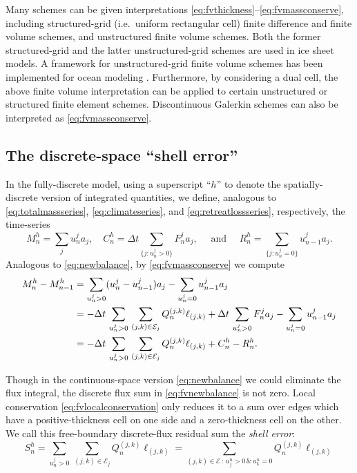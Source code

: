 \documentclass[final,leqno,onefignum,onetabnum]{siamltex1213bueler}
\begin{document}
Many schemes can be given interpretations \eqref{eq:fvthickness}--\eqref{eq:fvmassconserve}, including structured-grid (i.e.~uniform rectangular cell) finite difference \cite{MortonMayers2005} and finite volume \cite{LeVeque2002} schemes, and unstructured finite volume schemes.  Both the former structured-grid \cite{Winkelmannetal2011} and the latter unstructured-grid \cite{EgholmNielsen2010} schemes are used in ice sheet models.  A framework for unstructured-grid finite volume schemes has been implemented for ocean modeling \cite{Ringleretal2013}.  Furthermore, by considering a dual cell, the above finite volume interpretation can be applied to certain unstructured or structured finite element schemes.  Discontinuous Galerkin schemes can also be interpreted as \eqref{eq:fvmassconserve}.

\subsection{The discrete-space ``shell error''}  \label{subsec:shellerror}  In the fully-discrete model, using a superscript ``$h$'' to denote the spatially-discrete version of integrated quantities, we define, analogous to \eqref{eq:totalmassseries}, \eqref{eq:climateseries}, and \eqref{eq:retreatlossseries}, respectively, the time-series
\begin{equation}
  M_n^h = \sum_j u_n^j a_j, \quad C_n^h = \Delta t\!\!\sum_{\{j:u_n^j>0\}} F_n^j a_j, \quad \text{ and } \quad R_n^h = \sum_{\{j:u_n^j=0\}} u_{n-1}^j a_j.  \label{eq:fvtimeseriesdefn}
\end{equation}
Analogous to \eqref{eq:newbalance}, by \eqref{eq:fvmassconserve} we compute
\begin{align}
M_n^h - M_{n-1}^h &= \sum_{u_n^j>0} (u_n^j - u_{n-1}^j) a_j - \sum_{u_n^j=0} u_{n-1}^j a_j \notag \\
   &= - \Delta t\,\sum_{u_n^j>0}\, \sum_{(j,k)\in\mathcal{E}_j} Q_n^{(j,k)} \ell_{(j,k)} + \Delta t\,\sum_{u_n^j>0} F_n^j a_j - \sum_{u_n^j=0} u_{n-1}^j a_j \notag \\
   &= - \Delta t\,\sum_{u_n^j>0}\, \sum_{(j,k)\in\mathcal{E}_j} Q_n^{(j,k)} \ell_{(j,k)} + C_n^h - R_n^h.  \label{eq:fvnewbalance}
\end{align}

Though in the continuous-space version \eqref{eq:newbalance} we could eliminate the flux integral, the discrete flux sum in \eqref{eq:fvnewbalance} is not zero.  Local conservation \eqref{eq:fvlocalconservation} only reduces it to a sum over edges which have a positive-thickness cell on one side and a zero-thickness cell on the other.  We call this free-boundary discrete-flux residual sum the \emph{shell error}:
\begin{equation}
S_n^h = \sum_{u_n^j>0}\, \sum_{(j,k)\in\mathcal{E}_j} Q_n^{(j,k)} \ell_{(j,k)} = \sum_{(j,k)\in\mathcal{E} \,:\, u_j^n > 0 \,\&\, u_k^n = 0} Q_n^{(j,k)} \ell_{(j,k)} \label{eq:fvderiveshellerror}
\end{equation}
\end{document}

